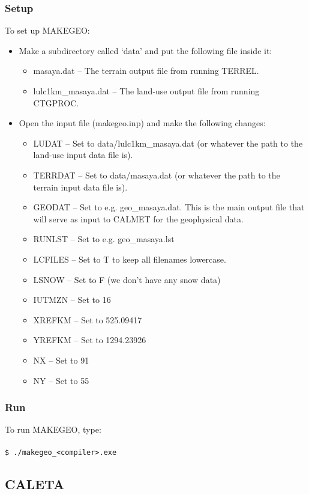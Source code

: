 \documentclass[10pt,a4paper]{article}
\newcommand\tab[1][0.5cm]{\hspace*{#1}}
\begin{document}
\subsubsection{Setup}
To set up MAKEGEO:
\begin{itemize}
\item Make a subdirectory called `data' and put the following file inside it:
\begin{itemize}
\item masaya.dat -- The terrain output file from running TERREL.
\item lulc1km\_masaya.dat -- The land-use output file from running CTGPROC.
\end{itemize}
\item Open the input file (makegeo.inp) and make the following changes:
\begin{itemize}
\item LUDAT -- Set to data/lulc1km\_masaya.dat (or whatever the path to the land-use input data file is).
\item TERRDAT -- Set to data/masaya.dat (or whatever the path to the terrain input data file is).
\item GEODAT -- Set to e.g. geo\_masaya.dat. This is the main output file that will serve as input to CALMET for the geophysical data.
\item RUNLST -- Set to e.g. geo\_masaya.lst
\item LCFILES -- Set to T to keep all filenames lowercase.
\item LSNOW -- Set to F (we don't have any snow data)
\item IUTMZN -- Set to 16
\item XREFKM -- Set to 525.09417
\item YREFKM -- Set to 1294.23926
\item NX -- Set to 91
\item NY -- Set to 55
\end{itemize}
\end{itemize}

\subsubsection{Run}
To run MAKEGEO, type:\\\\
\tab \texttt{\$ ./makegeo\_<compiler>.exe}

\subsection{CALETA}
\end{document}
